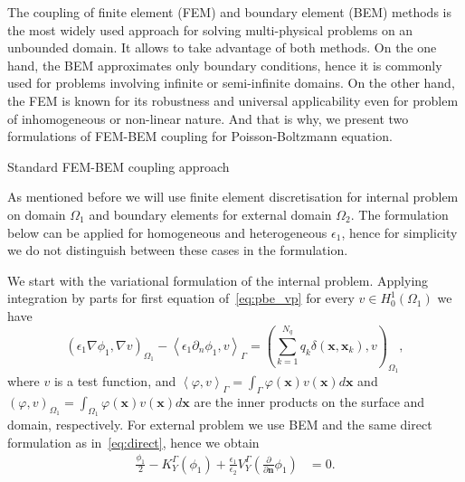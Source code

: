 The coupling of finite element (FEM) and boundary element (BEM) methods is the most widely used approach for solving multi-physical problems on an unbounded domain. It allows to take advantage of both methods. On the one hand, the BEM approximates only boundary conditions, hence it is commonly used for problems involving infinite or semi-infinite domains. On the other hand, the FEM is known for its robustness and universal applicability even for problem of inhomogeneous or non-linear nature.
And that is why, we present two formulations of FEM-BEM coupling for Poisson-Boltzmann equation.
    
{\sffamily \small Standard FEM-BEM coupling approach}
   
   As mentioned before we will use finite element discretisation for internal problem on domain $\Omega_1$ and boundary elements for external domain $\Omega_2$. The formulation below can be applied for homogeneous and heterogeneous $\epsilon_1$, hence for simplicity we do not distinguish between these cases in the formulation.
    
    We start with the variational formulation of the internal problem. Applying integration by parts for first equation of~\eqref{eq:pbe_vp} for every $v \in H_0^1(\Omega_1)$ we have
\begin{equation}
\label{eq:fem}
 \left( \epsilon_1 \nabla \phi_1, \nabla v \right)_{\Omega_1}  -  \left<  \epsilon_1\partial_n \phi_1, v \right>_\Gamma =  \left( \sum_{k=1}^{N_q} q_k\delta(\mathbf{x},\mathbf{x}_k),  v\right)_{\Omega_1},
\end{equation}
where $v$ is a test function, and $\left<\varphi,v\right>_\Gamma = \int_\Gamma \varphi(\mathbf{x})v(\mathbf{x})d\mathbf{x}$ and $\left(\varphi,v\right)_{\Omega_1} = \int_{\Omega_1} \varphi(\mathbf{x})v(\mathbf{x})d\mathbf{x}$ are the inner products on the surface and domain, respectively.
For external problem we use BEM and the same direct formulation as in~\eqref{eq:direct}, hence we obtain
\begin{align*}
\tfrac{\phi_1}{2} - K_{Y}^{\Gamma}(\phi_1) + \tfrac{\epsilon_1}{\epsilon_2}V_{Y}^{\Gamma} \left( \frac{\partial}{\partial \mathbf{n}} \phi_1 \right) & = 0.
\end{align*}

